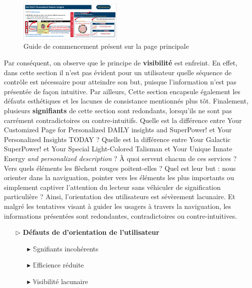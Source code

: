 \documentclass[9pt]{report}
\newcommand{\mathpazott}{\fontfamily{pplj}\selectfont}
\renewcommand{\texttt}[1]{{\scriptsize\mathpazott #1}}
\begin{document}
\begin{multicols*}{2}
  \begin{figure}[H]
    \begin{center}
      \includegraphics[width=0.45\textwidth]{Orientation.png}
    \end{center}
    \caption{Guide de commencement présent sur la page principale}
  \end{figure}

    Par conséquent, on observe que le principe de \textbf{visibilité} 
    est enfreint. En effet, dans cette section il n'est pas 
    évident pour un utilisateur quelle séquence de contrôle est 
    nécessaire pour atteindre son but, puisque l'information 
    n'est pas présentée de façon intuitive. 
    Par ailleurs, Cette section 
    encapsule également les défauts esthétiques et les 
    lacunes de consistance mentionnés plus tôt. Finalement, plusieurs 
    \textbf{signifiants} de cette section sont redondants, 
    lorsqu'ils ne sont pas carrément contradictoires ou 
    contre-intuitifs. Quelle est la différence entre 
  \texttt{Your Customized Page for Personalized DAILY insights and SuperPower!}  et \texttt{Your Personalized Insights TODAY} ? Quelle est la différence 
  entre \texttt{Your Galactic SuperPower!} et \texttt{Your Special Light-Colored Talisman} et \texttt{Your Unique Innate Energy \textit{and personalized description}} ? À quoi servent chacun de ces services ? Vers quels éléments 
  les flèchent rouges poitent-elles ? Quel est leur but : nous orienter 
  dans la naviguation, pointer vers les éléments les plus importants 
  ou simplement captiver l'attention du lecteur sans véhiculer de 
  signification particulière ? Ainsi, l'orientation des utilisateurs 
  est sévèrement lacunaire. Et malgré les tentatives visant à guider les usagers à travers la naviguation, les informations présentées 
  sont redondantes, contradictoires ou contre-intuitives. 


  
  \begin{itemize}
    \item [$\rhd$ ] \textbf{Défauts de d'orientation de l'utilisateur}  
      \begin{itemize}
        \item [$\blacktriangleright$ ] $\mathbb{S}$gnifiants incohérents
        \item [$\blacktriangleright$ ] $\mathbb{E}$fficience réduite
        \item [$\blacktriangleright$ ] $\mathbb{V}$isibilité lacunaire 
      \end{itemize}
  \end{itemize}


\end{multicols*}
\end{document}
